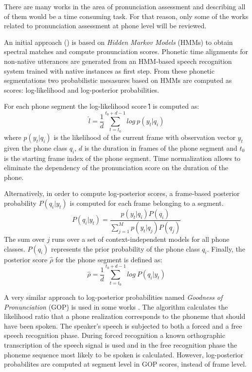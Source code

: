 There are many works in the area of pronunciation assessment and describing all of them would
be a time consuming task. For that reason, only some of the works related to 
pronunciation assessment at phone level will be reviewed.

An initial approach
(\cite{pronunciation_scoring_instruction}\cite{pronunciation_scoring_phone_segments_instruction}) 
is based on \textit{Hidden Markov Models} (HMMs) to obtain 
spectral matches and compute pronunciation scores. Phonetic time alignments for
non-native utterances are generated from an HMM-based speech recognition system trained
with native instances as first step. From these phonetic segmentations two 
probabilistic mesasures based on HMMs are computed as scores: log-likelihood and 
log-posterior probabilities.

For each phone segment the log-likelihood score \^{l} is computed as:
\begin{equation}
\hat{l} = \frac{1}{d} \sum_{t=t_{0}}^{t_{0}+d-1} log \ p(y_{t}|q_{i})
\end{equation}
where $p(y_{t}|q_{i})$ is the likelihood of the current frame with observation vector $y_{t}$
given the phone class $q_{i}$, $d$ is the duration in frames of the phone segment 
and $t_{0}$ is the starting frame index of the phone segment. Time normalization allows to 
eliminate the dependency of the pronunciation score on the duration of the phone.

Alternatively, in order to compute log-posterior scores, a frame-based posterior probability
$P(q_{i}|y_{t})$ is computed for each frame belonging to a segment.
\begin{equation}
P(q_{i}|y_{t}) = \frac{p(y_{t}|q_{i})P(q_{i})}{\sum\limits_{j=1}^{M} p(y_{t}|q_{j})P(q_{j})}
\end{equation}
The sum over $j$ runs over a set of context-independent models for all phone classes. $P(q_{i})$
represents the prior probability of the phone class $q_{i}$. Finally, the posterior score $\hat{\rho}$ for the phone segment is defined as:
\begin{equation}
\hat{\rho} = \frac{1}{d}\sum_{t=t_{0}}^{t_{0}+d-1} log \ P(q_{i}|y_{t})
\end{equation}

A very similar approach to log-posterior probabilities named \textit{Goodness of Pronunciation}
(GOP) is used in some works \cite{gop_1} \cite{gop_2} \cite{gop_3}. The algorithm calculates the 
likelihood ratio that a phone realization corresponds to the phoneme that should have been
spoken. The speaker's speech is subjected to both a forced and a free speech recognition phase.
During forced recognition a known orthographic transcription of the speech signal is used
and in the free recognition phase the phoneme sequence most likely to be spoken is calculated.
However, log-posterior probabilites are computed at segment level in GOP scores, instead of 
frame level.

